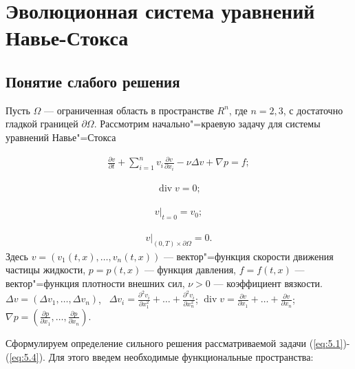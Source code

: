 \section{Эволюционная система уравнений \\Навье-Стокса}
\subsection {Понятие слабого решения}
Пусть $\Omega$ --- ограниченная область в пространстве $R^n$, где $n=2, 3$, с достаточно гладкой границей $\partial\Omega$.
Рассмотрим начально"=краевую задачу для системы уравнений Навье"=Стокса

\begin{equation}\label{eq:5.1}
    \begin{gathered}
        \frac{\partial v}{\partial t}+\sum_{i=1}^nv_i\frac{\partial v}{\partial x_i}-\nu\Delta v+\nabla p=f;
    \end{gathered}
\end{equation}

\begin{equation}\label{eq:5.2}
    \begin{gathered}
        \operatorname{div} v=0;
    \end{gathered}
\end{equation}

\begin{equation}\label{eq:5.3}
    \begin{gathered}
        v|_{t=0}=v_0;
    \end{gathered}
\end{equation}

\begin{equation}\label{eq:5.4}
    \begin{gathered}
        v|_{(0, T)\times\partial\Omega}=0.
    \end{gathered}
\end{equation}
Здесь $v=(v_1(t, x),\ldots,v_n(t, x))$ --- вектор"=функция скорости движения частицы жидкости, $p=p(t, x)$ --- функция давления,
$f=f(t, x)$ --- вектор"=функция плотности внешних сил, $\nu>0$ --- коэффициент вязкости.
$\Delta v=(\Delta v_1,\ldots,\Delta v_n)$, \ $\Delta v_i= \frac{\partial^2 v_i}{\partial x_1^2}+\ldots+\frac{\partial^2 v_i}{\partial x_n^2}$;
$\operatorname{div} v= \frac{\partial v}{\partial x_1}+\ldots+\frac{\partial v}{\partial x_n}$;
$\nabla p=(\frac{\partial p}{\partial x_1},\ldots,\frac{\partial p}{\partial x_n})$.

Сформулируем определение сильного решения рассматриваемой задачи (\ref{eq:5.1})-(\ref{eq:5.4}).
Для этого введем необходимые функциональные пространства:

